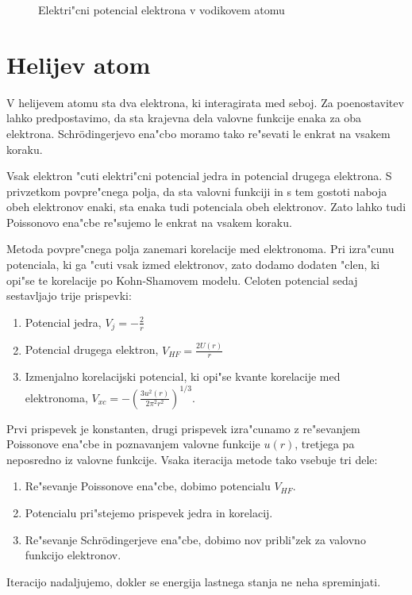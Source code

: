 \documentclass[a4paper,10pt]{article}
\begin{document}
\begin{figure}[H]
 \caption{Elektri"cni potencial elektrona v vodikovem atomu}
 \label{fig:vodik-potencial}
\end{figure}

\section{Helijev atom}

V helijevem atomu sta dva elektrona, ki interagirata med seboj. 
Za poenostavitev lahko predpostavimo, da sta krajevna dela valovne funkcije enaka za oba elektrona. 
Schr\"odingerjevo ena"cbo moramo tako re"sevati le enkrat na vsakem koraku. 

Vsak elektron "cuti elektri"cni potencial jedra in potencial drugega elektrona. 
S privzetkom povpre"cnega polja, da sta valovni funkciji in s tem gostoti naboja obeh elektronov enaki, sta enaka tudi potenciala obeh elektronov. 
Zato lahko tudi Poissonovo ena"cbe re"sujemo le enkrat na vsakem koraku. 

Metoda povpre"cnega polja zanemari korelacije med elektronoma. 
Pri izra"cunu potenciala, ki ga "cuti vsak izmed elektronov, zato dodamo dodaten "clen, ki opi"se te korelacije po Kohn-Shamovem modelu. 
Celoten potencial sedaj sestavljajo trije prispevki:

\begin{enumerate}
 \item Potencial jedra, $V_j = -\frac{2}{r}$
 \item Potencial drugega elektron, $V_{HF} = \frac{2U(r)}{r}$
 \item Izmenjalno korelacijski potencial, ki opi"se kvante korelacije med elektronoma, $V_{xc} = -\left( \frac{3u^2(r)}{2\pi^2r^2} \right)^{1/3}$. 
\end{enumerate}

Prvi prispevek je konstanten, drugi prispevek izra"cunamo z re"sevanjem Poissonove ena"cbe in poznavanjem valovne funkcije $u(r)$, tretjega pa neposredno iz valovne funkcije. 
Vsaka iteracija metode tako vsebuje tri dele:

\begin{enumerate}
 \item Re"sevanje Poissonove ena"cbe, dobimo potencialu $V_{HF}$. 
 \item Potencialu pri"stejemo prispevek jedra in korelacij.
 \item Re"sevanje Schr\"odingerjeve ena"cbe, dobimo nov pribli"zek za valovno funkcijo elektronov. 
\end{enumerate}

Iteracijo nadaljujemo, dokler se energija lastnega stanja ne neha spreminjati. 
\end{document}
